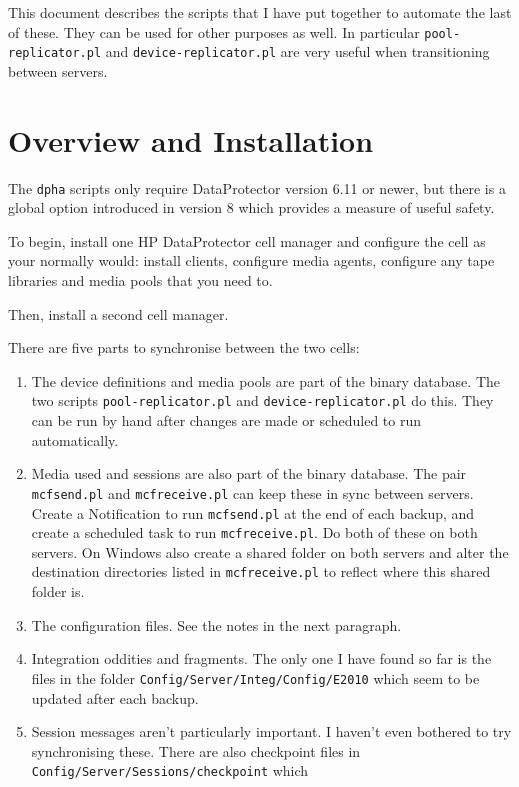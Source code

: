 \documentclass{article}
\begin{document}
This document describes the scripts that I have put together to automate the last of these. They can be used for other purposes as well. In particular {\tt pool-replicator.pl} and {\tt device-replicator.pl} are very useful when transitioning between servers.

\section*{Overview and Installation}

The {\tt dpha} scripts only require DataProtector version 6.11 or newer, but there is a global option introduced in version 8 which provides a measure of useful safety.

To begin, install one HP DataProtector cell manager and configure the cell as your normally would: install clients, configure media agents, configure any tape libraries and media pools that you need to.

Then, install a second cell manager.

There are five parts to synchronise between the two cells:
\begin{enumerate}
\item The device definitions and media pools are part of the binary database. The two scripts {\tt pool-replicator.pl} and {\tt device-replicator.pl} do this. They can be run by hand after changes are made or scheduled to run automatically.  
\item Media used and sessions are also part of the binary database. The pair {\tt mcfsend.pl} and {\tt mcfreceive.pl} can keep these in sync between servers. Create a Notification to run {\tt mcfsend.pl} at the end of each backup, and create a scheduled task to run {\tt mcfreceive.pl}. Do both of these on both servers. On Windows also create a shared folder on both servers and alter the destination directories listed in {\tt mcfreceive.pl} to reflect where this shared folder is.
\item The configuration files. See the notes in the next paragraph.
\item Integration oddities and fragments. The only one I have found so far is the files in the folder {\tt Config/Server/Integ/Config/E2010} which seem to be updated after each backup.
\item Session messages aren't particularly important. I haven't even bothered to try synchronising these. There are also checkpoint files in {\tt Config/Server/Sessions/checkpoint} which
\end{enumerate}
\end{document}
